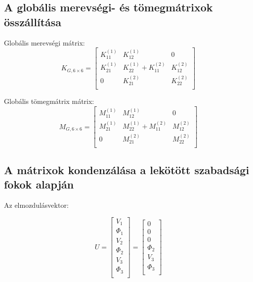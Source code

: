 \documentclass{article}
\begin{document}
	
	
	\subsection{A globális merevségi- és tömegmátrixok összállítása}
		
		Globális merevségi mátrix:
		\begin{equation}
			K_{G,6\times6}=
			\begin{bmatrix}
			K_{11}^{(1)} & K_{12}^{(1)}              & 0            \\
			K_{21}^{(1)} & K_{22}^{(1)}+K_{11}^{(2)} & K_{12}^{(2)} \\
			0            & K_{21}^{(2)}              & K_{22}^{(2)} \\
			\end{bmatrix}
		\end{equation}
		
		Globális tömegmátrix mátrix:
		\begin{equation}
			M_{G,6\times6}=
			\begin{bmatrix}
			M_{11}^{(1)} & M_{12}^{(1)}              & 0            \\
			M_{21}^{(1)} & M_{22}^{(1)}+M_{11}^{(2)} & M_{12}^{(2)} \\
			0            & M_{21}^{(2)}              & M_{22}^{(2)} \\
			\end{bmatrix}
		\end{equation}
	 
	
	\subsection{A mátrixok kondenzálása a lekötött szabadsági fokok alapján}	
	
	Az elmozdulásvektor:
	
	\begin{equation}
		U=
		\begin{bmatrix}
		V_{1}    \\
		\Phi_{1} \\
		V_{2}    \\
		\Phi_{2} \\
		V_{3}    \\
		\Phi_{3} \\
		\end{bmatrix}
		=
		\begin{bmatrix}
		0  \\
		0 \\
		0    \\
		\Phi_{2} \\
		V_{3}    \\
		\Phi_{3} \\
		\end{bmatrix}
	\end{equation}
	
\end{document}
